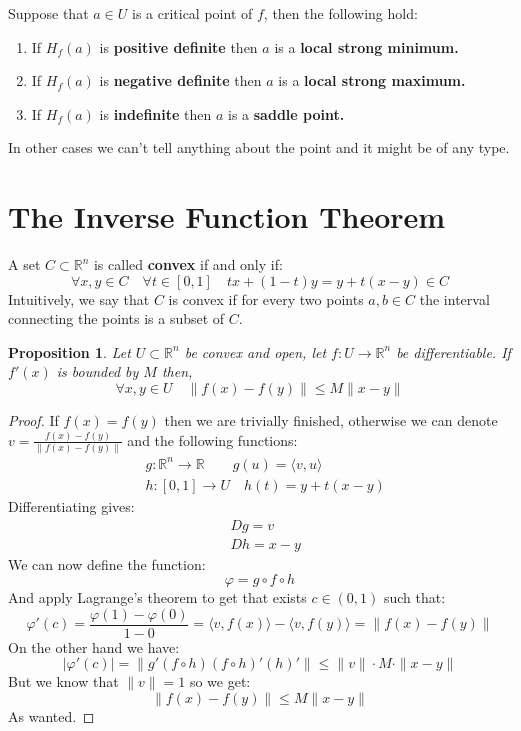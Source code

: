 \documentclass[11pt,a4paper]{article}
\theoremstyle{definition}
\theoremstyle{plain}
\newtheorem{proposition}[theorem]{Proposition}
\newcommand{\R}{\mathbb{R}}
\newcommand{\ip}[2]{\langle #1, #2 \rangle}
\begin{document}
	\newpage
	
	Suppose that $a \in U$ is a critical point of $f$, then the following
	hold:
	\begin{enumerate}
		\item If $H_f(a)$ is \textbf{positive definite} then $a$ is a 
		\textbf{local strong minimum.}
		\item If $H_f(a)$ is \textbf{negative definite} then $a$ is a 
		\textbf{local strong maximum.}
		\item If $H_f(a)$ is \textbf{indefinite} then $a$ is a 
		\textbf{saddle point.}
	\end{enumerate}
	In other cases we can't tell anything about the point and it might be
	of any type.

	\newpage
	
	\section{The Inverse Function Theorem}
	A set $C \subset \R^n$ is called \textbf{convex} if and only if:
	\[
		\forall x,y \in C \quad \forall t \in [0,1] \quad
		tx + (1-t)y = y + t(x-y) \in C
	\]
	Intuitively, we say that $C$ is convex if for every two points $a,b \in C$
	the interval connecting the points is a subset of $C$.
	\begin{proposition}
		Let $U \subset \R^n$ be convex and open, let $f \colon U \to \R^n$
		be differentiable. If $f'(x)$ is bounded by $M$ then,
		\[
			 \forall x,y \in U \quad \|f(x) - f(y)\| \le M\|x - y\|
		\]
	\end{proposition}
	\begin{proof}
		If $f(x) = f(y)$ then we are trivially finished, otherwise we can
		denote $v = \frac{f(x) - f(y)}{\|f(x) - f(y)\|}$ and the following
		functions:
		\begin{align*}
			&g \colon \R^n \to \R \quad \quad g(u) = \ip{v}{u} \\
			&h \colon [0,1] \to U \quad h(t) = y + t(x-y)
		\end{align*}
		Differentiating gives:
		\begin{align*}
			&Dg = v \\
			&Dh = x-y
		\end{align*}
	We can now define the function:
	\[
		\varphi = g \circ f \circ h
	\]
	And apply Lagrange's theorem to get that exists $c \in (0,1)$ such that:
	\[
		\varphi'(c) = \frac{\varphi(1) - \varphi(0)}{1 - 0} = 
		\ip{v}{f(x)} - \ip{v}{f(y)} = \|f(x) - f(y)\|
	\]
	On the other hand we have:
	\[
		|\varphi'(c)| = \|g'(f \circ h)(f \circ h)'(h)'\| \le 
		\|v\| \cdot M \cdot \|x - y\|
	\]
	But we know that $\|v\| = 1$ so we get:
	\[
		\|f(x) - f(y)\| \le M\|x - y\|
	\]
	As wanted.
	\end{proof}
\end{document}
